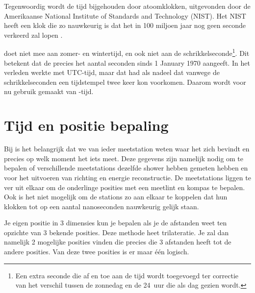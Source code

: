 Tegenwoordig wordt de tijd bijgehouden door atoomklokken, uitgevonden door
de Amerikaanse National Institute of Standards and Technology (NIST).
Het NIST heeft een klok die zo nauwkeurig is dat het in 100 miljoen jaar
nog geen seconde verkeerd zal lopen \cite{nist2013ces}.

\gps doet niet
mee aan zomer- en wintertijd, en ook niet aan de
schrikkelseconde\footnote{Een extra seconde die af en toe aan de tijd
wordt toegevoegd ter correctie van het verschil tussen de zonnedag en de
\SI{24}{uur} die als dag gezien wordt.}. Dit betekent dat de \gps
precies het aantal seconden sinds 1 January 1970 aangeeft. In het
verleden werkte \hisparc met UTC-tijd, maar dat had als nadeel dat vanwege de schrikkelseconden een
tijdstempel twee keer kon voorkomen. Daarom wordt voor \hisparc nu gebruik gemaakt van \gps-tijd.


\section{Tijd en positie bepaling}

Bij \hisparc is het belangrijk dat we van ieder meetstation weten waar
het zich bevindt en precies op welk moment het iets meet. Deze gegevens
zijn namelijk nodig om te bepalen of verschillende meetstations dezelfde
shower hebben gemeten hebben en voor het uitvoeren van richting en
energie reconstructie. De meetstations liggen te ver uit elkaar om de
onderlinge posities met een meetlint en kompas te bepalen. Ook is het
niet mogelijk om de stations zo aan elkaar te koppelen dat hun klokken
tot op een aantal nanoseconden nauwkeurig gelijk staan.

Je eigen positie in 3 dimensies kun je bepalen als je de afstanden weet ten opzichte van 3 bekende posities. Deze methode heet
trilateratie. Je zal dan namelijk 2 mogelijke posities vinden die precies die 3 afstanden heeft tot de andere posities. Van deze twee posities is er maar \'e\'en logisch.

